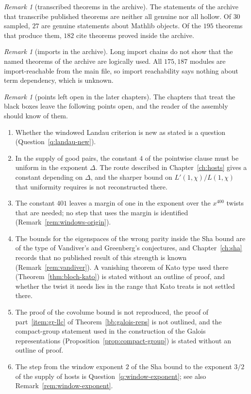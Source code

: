 \documentclass[11pt]{amsbook}
\theoremstyle{plain}
\theoremstyle{definition}
\theoremstyle{remark}
\newtheorem{remark}[theorem]{Remark}
\numberwithin{equation}{section}
\numberwithin{figure}{chapter}
\numberwithin{table}{chapter}
\begin{document}
\begin{remark}[transcribed theorems in the archive]\label{rem:ai-transcribed}
The statements of the archive that transcribe published theorems are
neither all genuine nor all hollow. Of $30$ sampled, $27$ are genuine
statements about Mathlib objects. Of the $195$ theorems that produce
them, $182$ cite theorems proved inside the archive.
\end{remark}

\begin{remark}[imports in the archive]\label{rem:ai-imports}
Long import chains do not show that the named theorems of the archive
are logically used. All $175{,}187$ modules are import-reachable from
the main file, so import reachability says nothing about term
dependency, which is unknown.
\end{remark}

\begin{remark}[points left open in the later chapters]
\label{rem:bb-open}
The chapters that treat the black boxes leave the following points
open, and the reader of the assembly should know of them.
\begin{enumerate}[label=(\arabic*)]
\item Whether the windowed Landau criterion is new as stated is a
question (Question~\ref{q:landau-new}).
\item In the supply of good pairs, the constant $4$ of the pointwise
clause must be uniform in the exponent $\Delta$. The route described
in Chapter~\ref{ch:hosts} gives a constant depending on $\Delta$,
and the sharper bound on $L'(1,\chi)/L(1,\chi)$ that uniformity
requires is not reconstructed there.
\item The constant $401$ leaves a margin of one in the exponent
over the $x^{400}$ twists that are needed; no step that uses the
margin is identified (Remark~\ref{rem:windows-origin}).
\item The bounds for the eigenspaces of the wrong parity inside the
Sha bound are of the type of Vandiver's and Greenberg's conjectures,
and Chapter~\ref{ch:sha} records that no published result of this
strength is known (Remark~\ref{rem:vandiver}). A vanishing theorem of Kato
type used there (Theorem~\ref{thm:bloch-kato}) is stated without an
outline of proof, and whether the twist it needs lies in the range
that Kato treats is not settled there.
\item The proof of the covolume bound is not reproduced, the proof
of part~\ref{item:gr-llc} of Theorem~\ref{bb:galois-reps} is not
outlined, and the compact-group statement used in the construction
of the Galois representations
(Proposition~\ref{prop:compact-group}) is stated without an outline
of proof.
\item The step from the window exponent $2$ of the Sha bound to the
exponent $3/2$ of the supply of hosts is
Question~\ref{q:window-exponent}; see also
Remark~\ref{rem:window-exponent}.
\end{enumerate}
\end{remark}
\clearpage
\clearpage
\end{document}

